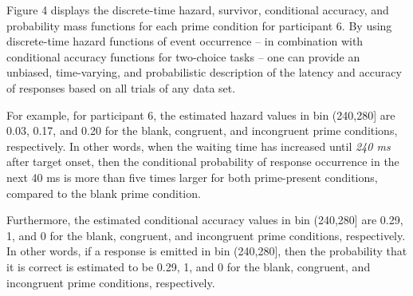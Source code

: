 \documentclass[
  man, donotrepeattitle,floatsintext]{apa6}
\begin{document}
Figure 4 displays the discrete-time hazard, survivor, conditional accuracy, and probability mass functions for each prime condition for participant 6. By using discrete-time hazard functions of event occurrence -- in combination with conditional accuracy functions for two-choice tasks -- one can provide an unbiased, time-varying, and probabilistic description of the latency and accuracy of responses based on all trials of any data set.

For example, for participant 6, the estimated hazard values in bin (240,280{]} are 0.03, 0.17, and 0.20 for the blank, congruent, and incongruent prime conditions, respectively. In other words, when the waiting time has increased until \emph{240 ms} after target onset, then the conditional probability of response occurrence in the next 40 ms is more than five times larger for both prime-present conditions, compared to the blank prime condition.

Furthermore, the estimated conditional accuracy values in bin (240,280{]} are 0.29, 1, and 0 for the blank, congruent, and incongruent prime conditions, respectively. In other words, if a response is emitted in bin (240,280{]}, then the probability that it is correct is estimated to be 0.29, 1, and 0 for the blank, congruent, and incongruent prime conditions, respectively.
\end{document}
